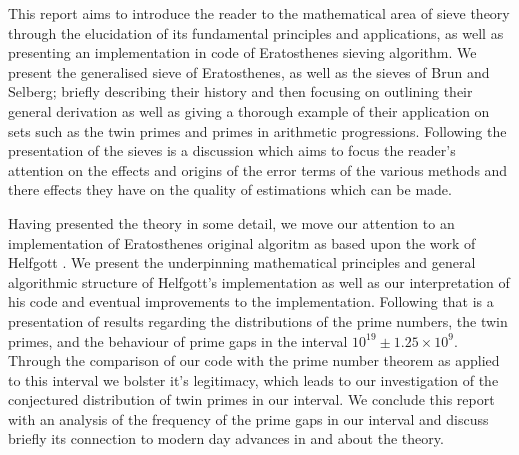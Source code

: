 This report aims to introduce the reader to the mathematical area of sieve theory through the elucidation of its fundamental principles and applications, as well as presenting an implementation in code of Eratosthenes sieving algorithm. 
We present the generalised sieve of Eratosthenes, as well as the sieves of Brun and Selberg; briefly describing their history and then focusing on outlining their general derivation as well as giving a thorough example of their application on sets such as the twin primes and primes in arithmetic progressions. 
Following the presentation of the sieves is a discussion which aims to focus the reader's attention on the effects and origins of the error terms of the various methods and there effects they have on the quality of estimations which can be made.

Having presented the theory in some detail, we move our attention to an implementation of Eratosthenes original algoritm as based upon the work of Helfgott \cite{HaraldSieve}.
We present the underpinning mathematical principles and general algorithmic structure of Helfgott's implementation as well as our interpretation of his code and eventual improvements to the implementation.
Following that is a presentation of results regarding the distributions of the prime numbers, the twin primes, and the behaviour of prime gaps in the interval \(10^{19}\pm 1.25\times10^9\).
Through the comparison of our code with the prime number theorem as applied to this interval we bolster it's legitimacy, which leads to our investigation of the conjectured distribution of twin primes in our interval.
We conclude this report with an analysis of the frequency of the prime gaps in our interval and discuss briefly its connection to modern day advances in and about the theory.